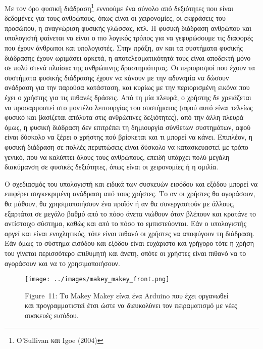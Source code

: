 \documentclass[
]{article}
\begin{document}
Με τον όρο φυσική διάδραση\footnote{O'Sullivan και Igoe (2004)} εννοούμε
ένα σύνολο από δεξιότητες που είναι δεδομένες για τους ανθρώπους, όπως
είναι οι χειρονομίες, οι εκφράσεις του προσώπου, η αναγνώριση φυσικής
γλώσσας, κτλ. Η φυσική διάδραση ανθρώπου και υπολογιστή φαίνεται να
είναι ο πιο λογικός τρόπος για να γεφυρώσουμε τις διαφορές που έχουν
άνθρωποι και υπολογιστές. Στην πράξη, αν και τα συστήματα φυσικής
διάδρασης έχουν ωριμάσει αρκετά, η αποτελεσματικότητά τους είναι
αποδεκτή μόνο σε πολύ στενά πλαίσια της ανθρώπινης δραστηριότητας. Οι
περιορισμοί που έχουν τα συστήματα φυσικής διάδρασης έχουν να κάνουν με
την αδυναμία να δώσουν ανάδραση για την παρούσα κατάσταση, και κυρίως με
την περιορισμένη εικόνα που έχει ο χρήστης για τις πιθανές δράσεις. Από
τη μία πλευρά, ο χρήστης δε χρειάζεται να προσαρμοστεί στο μοντέλο
λειτουργίας του συστήματος (αφού αυτό είναι τελείως φυσικό και βασίζεται
απόλυτα στις ανθρώπινες δεξιότητες), από την άλλη πλευρά όμως, η φυσική
διάδραση δεν επιτρέπει τη δημιουργία σύνθετων συστημάτων, αφού είναι
δύσκολο να ξέρει ο χρήστης πού βρίσκεται και τι μπορεί να κάνει.
Επιπλέον, η φυσική διάδραση σε πολλές περιπτώσεις είναι δύσκολο να
κατασκευαστεί με τρόπο γενικό, που να καλύπτει όλους τους ανθρώπους,
επειδή υπάρχει πολύ μεγάλη διακύμανση σε φυσικές δεξιότητες, όπως είναι
οι χειρονομίες ή η ομιλία.

O σχεδιασμός του υπολογιστή και ειδικά των συσκευών εισόδου και εξόδου
μπορεί να επιφέρει συγκεκριμένη ανάδραση από τους χρήστες. Το αν οι
χρήστες θα αγοράσουν, θα μάθουν, θα χρησιμοποιήσουν ένα προϊόν ή αν θα
συνεργαστούν με άλλους, εξαρτάται σε μεγάλο βαθμό από το πόσο άνετα
νιώθουν όταν βλέπουν και κρατάνε το αντίστοιχο σύστημα, καθώς και από το
πόσο το εμπιστεύονται. Εάν ο υπολογιστής αργεί και είναι ενοχλητικός,
τότε είναι πιθανό οι χρήστες να αποφύγουν τη διάδραση. Εάν όμως το
σύστημα εισόδου και εξόδου είναι ευχάριστο και γρήγορο τότε η χρήση του
γίνεται περισσότερο επιθυμητή και άνετη, οπότε οι χρήστες είναι πιθανό
να το αγοράσουν και να το χρησιμοποιήσουν.

\leavevmode{}%
\begin{figure}
\hypertarget{fig:makey_makey_front}{%
\centering
\texttt{[image: ../images/makey\_makey\_front.png]}
\caption{Figure~11: Το Makey Makey είναι ένα Arduino που έχει οργανωθεί
και προγραμματιστεί έτσι ώστε να διευκολύνει τον πειραματισμό με νέες
συσκευές εισόδου.}\label{fig:makey_makey_front}
}
\end{figure}
\end{document}
